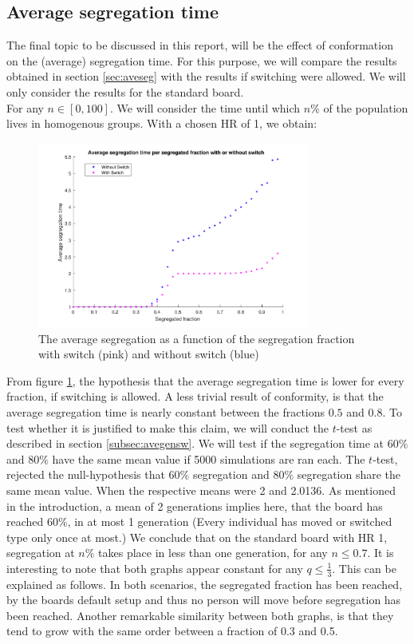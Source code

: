 \subsection{Average segregation time}
The final topic to be discussed in this report, will be the effect of conformation on the (average) segregation time. 
For this purpose, we will compare the results obtained in section \ref{sec:aveseg} with the results if switching were allowed. 
We will only consider the results for the standard board.\\
For any \(n\in [0,100]\). We will consider the time until which \(n\%\) of the population lives in homogenous groups. With a chosen HR of 1, we obtain:

\begin{figure}[H]
    \centering
    \includegraphics[width=0.8\textwidth]{Avesegsw2}
    \caption{The average segregation as a function of the segregation fraction with switch (pink) and without switch (blue)}
    \label{fig:avesegsw}
\end{figure}

From figure \ref{fig:avesegsw}, the hypothesis that the average segregation time is lower for every fraction, if switching is allowed. 
A less trivial result of conformity, is that the average segregation time is nearly constant between the fractions \(0.5\) and \(0.8\). 
To test whether it is justified to make this claim, we will conduct the \(t\)-test as described in section \ref{subsec:avegensw}. We will test if the segregation time at \(60\%\) and \(80\%\) have the same mean value if 5000 simulations are ran each. 
The \(t\)-test, rejected the null-hypothesis that \(60\%\) segregation and \(80\%\) segregation share the same mean value. When the respective means were 2 and 2.0136. As mentioned in the introduction, a mean of 2 generations implies here, that the board has reached \(60\%\), in at most 1 generation (Every individual has moved or switched type only once at most.)
We conclude that on the standard board with HR 1, segregation at \(n\%\) takes place in less than one generation, for any \(n\leq 0.7\). 
It is interesting to note that both graphs appear constant for any \(q\leq \frac{1}{3}\). 
This can be explained as follows. In both scenarios, the segregated fraction has been reached, by the boards default setup and thus no person will move before segregation has been reached.
Another remarkable similarity between both graphs, is that they tend to grow with the same order between a fraction of 0.3 and 0.5.
